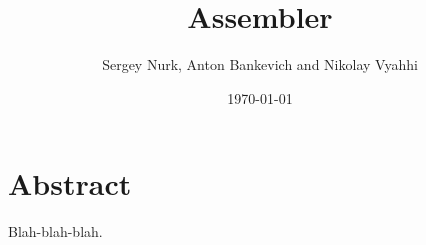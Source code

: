 \documentclass[12pt]{article}
\title{Assembler}
\author{Sergey Nurk, Anton Bankevich and Nikolay Vyahhi}
\date{\today}
\begin{document}
\maketitle

\section{Abstract}

Blah-blah-blah.
\end{document}

